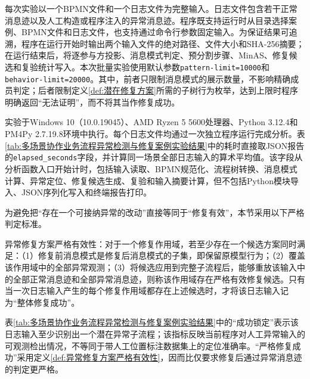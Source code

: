 每次实验以一个BPMN文件和一个日志文件为完整输入。日志文件包含若干正常消息迹以及人工构造或程序注入的异常消息迹。程序既支持运行时从目录选择案例、BPMN文件和日志文件，也支持通过命令行参数固定输入。为保证结果可追溯，程序在运行开始时输出两个输入文件的绝对路径、文件大小和SHA-256摘要；在运行结束后，将逐参与方投影、消息模式判定、预分割步骤、MinAS、修复候选和复验统计写入。本次批量实验使用默认参数\texttt{pattern-limit=10000}和\texttt{behavior-limit=20000}。其中，前者只限制消息模式的展示数量，不影响精确成员判定；后者限制定义\ref{def:潜在修复方案}所需的子树行为枚举，达到上限时程序明确返回“无法证明”，而不将其当作修复成功。

实验于Windows 10（10.0.19045）、AMD Ryzen 5 5600处理器、Python 3.12.4和PM4Py 2.7.19.8环境中执行。每个日志文件均通过一次独立程序运行完成分析。表\ref{tab:多场景协作业务流程异常检测与修复案例实验结果}中的耗时直接取JSON报告的\texttt{elapsed\_seconds}字段，并计算同一场景全部日志输入的算术平均值。该字段从分析函数入口开始计时，包括输入读取、BPMN规范化、流程树转换、消息模式计算、异常定位、修复候选生成、复验和输入摘要计算，但不包括Python模块导入、JSON序列化写入和终端报告打印。

为避免把“存在一个可接纳异常的改动”直接等同于“修复有效”，本节采用以下严格判定标准。

\begin{definition}
\label{def:异常修复方案严格有效性}
异常修复方案严格有效性：对于一个修复作用域，若至少存在一个候选方案同时满足：（1）修复前消息模式是修复后消息模式的子集，即保留原模型行为；（2）覆盖该作用域中的全部异常观测；（3）将候选应用到完整子流程后，能够重放该输入中的全部正常消息迹和全部异常消息迹，则称该作用域存在严格有效修复候选。只有当一次日志输入产生的每个修复作用域都存在上述候选时，才将该日志输入记为“整体修复成功”。
\end{definition}

表\ref{tab:多场景协作业务流程异常检测与修复案例实验结果}中的“成功锁定”表示该日志输入至少识别出一个潜在异常子流程；该指标反映当前程序对人工异常输入的可观测检出情况，不等同于带人工位置标注数据集上的定位准确率。“严格修复成功”采用定义\ref{def:异常修复方案严格有效性}，因而比仅要求修复后通过异常消息迹的判定更严格。

